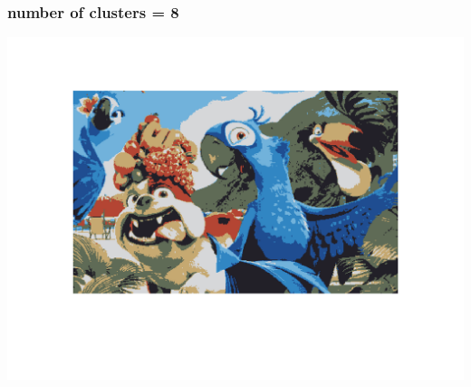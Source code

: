 \documentclass[fleqn]{article}
\begin{document}
\subsubsection{number of clusters = 8}
\includegraphics[scale=0.4]{./pics/task1and2/rio_k=8_random/K=8_iteration_79_random_8_rio.png}\\
\end{document}
